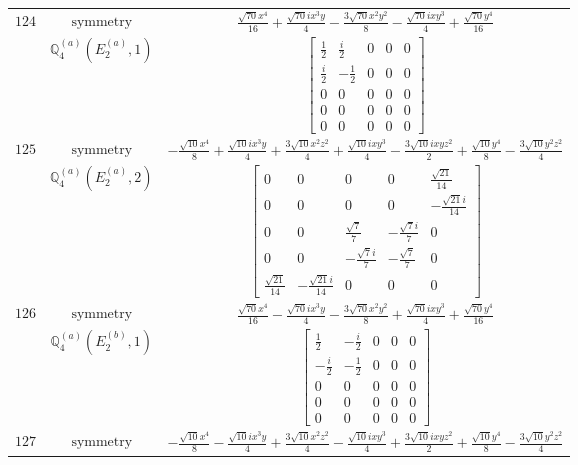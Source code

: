 \documentclass[fleqn,8pt,landscape]{jsarticle}
\begin{document}
\begin{longtable}{ccc}
$ 124 $ & $ \text{symmetry} $ & $ \frac{\sqrt{70} x^{4}}{16} + \frac{\sqrt{70} i x^{3} y}{4} - \frac{3 \sqrt{70} x^{2} y^{2}}{8} - \frac{\sqrt{70} i x y^{3}}{4} + \frac{\sqrt{70} y^{4}}{16} $ \\
$  $ & $ \mathbb{Q}_{4}^{(a)}(E_{2}^{(a)},1) $ & $ \begin{bmatrix} \frac{1}{2} & \frac{i}{2} & 0 & 0 & 0 \\ \frac{i}{2} & - \frac{1}{2} & 0 & 0 & 0 \\ 0 & 0 & 0 & 0 & 0 \\ 0 & 0 & 0 & 0 & 0 \\ 0 & 0 & 0 & 0 & 0 \end{bmatrix} $ \\ \hline
$ 125 $ & $ \text{symmetry} $ & $ - \frac{\sqrt{10} x^{4}}{8} + \frac{\sqrt{10} i x^{3} y}{4} + \frac{3 \sqrt{10} x^{2} z^{2}}{4} + \frac{\sqrt{10} i x y^{3}}{4} - \frac{3 \sqrt{10} i x y z^{2}}{2} + \frac{\sqrt{10} y^{4}}{8} - \frac{3 \sqrt{10} y^{2} z^{2}}{4} $ \\
$  $ & $ \mathbb{Q}_{4}^{(a)}(E_{2}^{(a)},2) $ & $ \begin{bmatrix} 0 & 0 & 0 & 0 & \frac{\sqrt{21}}{14} \\ 0 & 0 & 0 & 0 & - \frac{\sqrt{21} i}{14} \\ 0 & 0 & \frac{\sqrt{7}}{7} & - \frac{\sqrt{7} i}{7} & 0 \\ 0 & 0 & - \frac{\sqrt{7} i}{7} & - \frac{\sqrt{7}}{7} & 0 \\ \frac{\sqrt{21}}{14} & - \frac{\sqrt{21} i}{14} & 0 & 0 & 0 \end{bmatrix} $ \\ \hline
$ 126 $ & $ \text{symmetry} $ & $ \frac{\sqrt{70} x^{4}}{16} - \frac{\sqrt{70} i x^{3} y}{4} - \frac{3 \sqrt{70} x^{2} y^{2}}{8} + \frac{\sqrt{70} i x y^{3}}{4} + \frac{\sqrt{70} y^{4}}{16} $ \\
$  $ & $ \mathbb{Q}_{4}^{(a)}(E_{2}^{(b)},1) $ & $ \begin{bmatrix} \frac{1}{2} & - \frac{i}{2} & 0 & 0 & 0 \\ - \frac{i}{2} & - \frac{1}{2} & 0 & 0 & 0 \\ 0 & 0 & 0 & 0 & 0 \\ 0 & 0 & 0 & 0 & 0 \\ 0 & 0 & 0 & 0 & 0 \end{bmatrix} $ \\ \hline
$ 127 $ & $ \text{symmetry} $ & $ - \frac{\sqrt{10} x^{4}}{8} - \frac{\sqrt{10} i x^{3} y}{4} + \frac{3 \sqrt{10} x^{2} z^{2}}{4} - \frac{\sqrt{10} i x y^{3}}{4} + \frac{3 \sqrt{10} i x y z^{2}}{2} + \frac{\sqrt{10} y^{4}}{8} - \frac{3 \sqrt{10} y^{2} z^{2}}{4} $ \\

\end{longtable}
\end{document}

